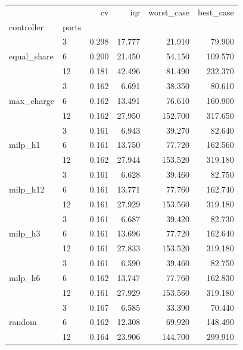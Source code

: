 \begin{tabular}{llrrrr}
\toprule
 &  & cv & iqr & worst_case & best_case \\
controller & ports &  &  &  &  \\
\midrule
\multirow[t]{3}{*}{equal_share} & 3 & 0.298 & 17.777 & 21.910 & 79.900 \\
 & 6 & 0.200 & 21.450 & 54.150 & 109.570 \\
 & 12 & 0.181 & 42.496 & 81.490 & 232.370 \\
\cline{1-6}
\multirow[t]{3}{*}{max_charge} & 3 & 0.162 & 6.691 & 38.350 & 80.610 \\
 & 6 & 0.162 & 13.491 & 76.610 & 160.900 \\
 & 12 & 0.162 & 27.950 & 152.700 & 317.650 \\
\cline{1-6}
\multirow[t]{3}{*}{milp_h1} & 3 & 0.161 & 6.943 & 39.270 & 82.640 \\
 & 6 & 0.161 & 13.750 & 77.720 & 162.560 \\
 & 12 & 0.162 & 27.944 & 153.520 & 319.180 \\
\cline{1-6}
\multirow[t]{3}{*}{milp_h12} & 3 & 0.161 & 6.628 & 39.460 & 82.750 \\
 & 6 & 0.161 & 13.771 & 77.760 & 162.740 \\
 & 12 & 0.161 & 27.929 & 153.560 & 319.180 \\
\cline{1-6}
\multirow[t]{3}{*}{milp_h3} & 3 & 0.161 & 6.687 & 39.420 & 82.730 \\
 & 6 & 0.161 & 13.696 & 77.720 & 162.640 \\
 & 12 & 0.161 & 27.833 & 153.520 & 319.180 \\
\cline{1-6}
\multirow[t]{3}{*}{milp_h6} & 3 & 0.161 & 6.590 & 39.460 & 82.750 \\
 & 6 & 0.162 & 13.747 & 77.760 & 162.830 \\
 & 12 & 0.161 & 27.929 & 153.560 & 319.180 \\
\cline{1-6}
\multirow[t]{3}{*}{random} & 3 & 0.167 & 6.585 & 33.390 & 70.440 \\
 & 6 & 0.162 & 12.308 & 69.920 & 148.490 \\
 & 12 & 0.164 & 23.906 & 144.700 & 299.910 \\
\cline{1-6}
\bottomrule
\end{tabular}
